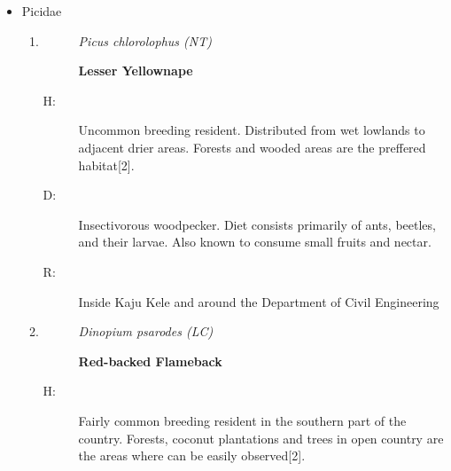 \begin{itemize}
\begin{enumerate}
\begin{description}%
\item[]%
\textit{Pavo cristatus (LC)}%
\item[]%
\textbf{Indian Peafowl}%
\end{description}%
\begin{description}%
\item[H: ]%
Common breeding resident in the dry zone lowlands. Uncommon in the intermediate zone. Scattered feral populations are found in the wet zone{[}2{]}.%
\item[D: ]%
omnivorous, consuming seeds, insects, fruits, small mammals, and reptiles, including small snakes. In agricultural areas, peafowl also eat a variety of crops.%
\item[R: ]%
Observed only once and was a female perched on a tree at boat yard.%
\end{description}%
\end{enumerate}%
\item%
Picidae%
\begin{enumerate}%
\item%
\begin{description}%
\item[]%
\textit{Picus chlorolophus (NT)}%
\item[]%
\textbf{Lesser Yellownape}%
\end{description}%
\begin{description}%
\item[H: ]%
Uncommon breeding resident. Distributed from wet lowlands to adjacent drier areas. Forests and wooded areas are the preffered habitat{[}2{]}.%
\item[D: ]%
Insectivorous woodpecker. Diet consists primarily of ants, beetles, and their larvae. Also known to consume small fruits and nectar.%
\item[R: ]%
Inside Kaju Kele and around the Department of Civil Engineering%
\end{description}%
\item%
\begin{description}%
\item[]%
\textit{Dinopium psarodes (LC)}%
\item[]%
\textbf{Red{-}backed Flameback}%
\end{description}%
\begin{description}%
\item[H: ]%
Fairly common breeding resident in the southern part of the country. Forests, coconut plantations and trees in open country are the areas where can be easily observed{[}2{]}.%

\end{description}
\end{enumerate}
\end{itemize}
